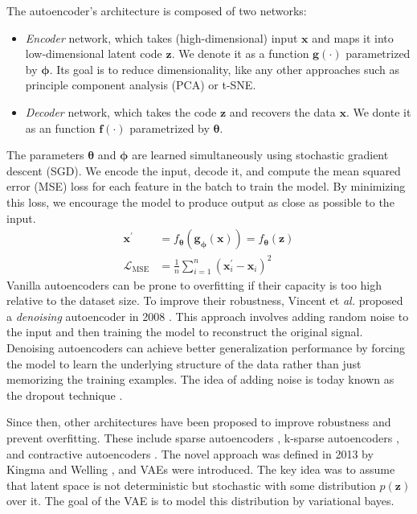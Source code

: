 The autoencoder's architecture is composed of two networks:
\begin{itemize}
    \item \textit{Encoder} network, which takes (high-dimensional) input $\boldsymbol{x}$ and maps it into low-dimensional latent code $\boldsymbol{z}$. We denote it as a
    function $\boldsymbol{g}(\cdot)$ parametrized by $\boldsymbol{\phi}$. Its goal is to reduce dimensionality, like 
    any other approaches such as principle component analysis (PCA) or t-SNE. 
    \item \textit{Decoder} network, which takes the code $\boldsymbol{z}$ and recovers the data $\boldsymbol{x}$. We donte it as an function $\boldsymbol{f}(\cdot)$ parametrized by $\boldsymbol{\theta}$.
\end{itemize}
The parameters $\boldsymbol{\theta}$ and $\boldsymbol{\phi}$ are learned simultaneously using stochastic gradient descent (SGD). We encode the input, decode it, and
compute the mean squared error (MSE) loss for each feature in the batch to train the model. By minimizing this loss, we encourage the model
to produce output as close as possible to the input.
\begin{align*}
    {\boldsymbol{x}}^\prime &= f_{\boldsymbol{\theta}}(\boldsymbol{g}_{\boldsymbol{\phi}}(\boldsymbol{x})) = f_{\boldsymbol{\theta}}(\boldsymbol{z}) \\
    \mathcal{L}_{\text{MSE}} &= \frac{1}{n} \sum_{i=1}^{n} (\boldsymbol{x}^{\prime}_i - \boldsymbol{x}_i)^2
\end{align*}
Vanilla autoencoders can be prone to overfitting if their capacity is too high relative to the dataset size. To improve their
robustness, Vincent et \textit{al.} proposed a \textit{denoising} autoencoder in 2008 \cite{denoising-ae-2008}. This approach involves adding
random noise to the input and then training the model to reconstruct the original signal. Denoising autoencoders can achieve better generalization performance by forcing the model to learn the underlying
structure of the data rather than just memorizing the training examples. The idea of adding noise is today known as the dropout technique \cite{dropout-2014}. 

Since then, other architectures have been proposed to improve robustness and prevent overfitting. These include sparse autoencoders
\cite{sparse-ae-2011}, k-sparse autoencoders \cite{ksparse-ae-2014}, and contractive autoencoders \cite{contractive-ae-2011}. The novel 
approach was defined in 2013 by Kingma and Welling \cite{vae-original-2013}, and VAEs were introduced. The key idea was to assume that 
latent space is not deterministic but stochastic with some distribution $p(\boldsymbol{z})$ over it. The goal of the VAE is to model this 
distribution by variational bayes. 

